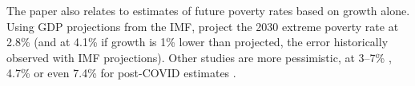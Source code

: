 The paper also relates to estimates of future poverty rates based on growth alone. Using GDP projections from the IMF, \cite{karver_mdgs_2012} project the 2030 extreme poverty rate at 2.8\% (and at 4.1\% if growth is 1\% lower than projected, the error historically observed with IMF projections). Other studies are more pessimistic, at 3--7\% \citep{chandy_final_2013,bicaba_can_2017}, 4.7\% \citep{manuel_financing_2018} or even 7.4\% for post-COVID estimates \citep{lakner_how_2022}. 

